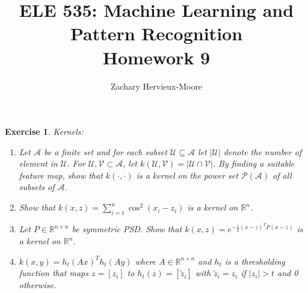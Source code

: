 \documentclass[12pt]{article}
\title{ELE 535: Machine Learning and Pattern Recognition \\ Homework 9}
\author{Zachary Hervieux-Moore}
\date{\displaydate{date}}
\theoremstyle{colon}
\newtheorem{exercise}{Exercise}
\begin{document}
\maketitle

\clearpage

\begin{exercise}
  Kernels:

  \begin{enumerate}[label=\alph*)]
    \item Let $\mathcal{A}$ be a finite set and for each subset $\mathcal{U} \subseteq \mathcal{A}$ let $\lvert \mathcal{U} \rvert$ denote the number of element in $\mathcal{U}$. For $\mathcal{U}, \mathcal{V} \subset \mathcal{A}$, let $k(\mathcal{U}, \mathcal{V}) = \lvert \mathcal{U} \cap \mathcal{V} \rvert$. By finding a suitable feature map, show that $k(\cdot, \cdot)$ is a kernel on the power set $\mathcal{P}(\mathcal{A})$ of all subsets of $\mathcal{A}$.

    \item Show that $k(x,z) = \sum_{i=1}^n \cos^2 (x_i - z_i)$ is a kernel on $\mathbb{R}^n$.

    \item Let $P \in \mathbb{R}^{n \times n}$ be symmetric PSD. Show that $k(x,z) = e^{-\frac{1}{2} (x-z)^T P (x-z)}$ is a kernel on $\mathbb{R}^n$.

    \item $k(x,y) = h_t(Ax)^T h_t(Ay)$ where $A \in \mathbb{R}^{n \times n}$ and $h_t$ is a thresholding function that maps $z = [z_i]$ to $h_t(z) = [\tilde{z}_i]$ with $\tilde{z}_i = z_i$ if $\lvert z_i \rvert > t$ and 0 otherwise.
  \end{enumerate}
\end{exercise}
\end{document}
